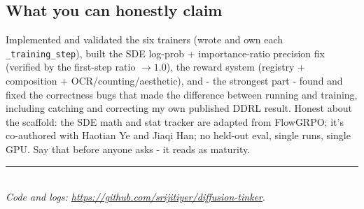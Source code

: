 \documentclass[11pt]{article}
\newcommand{\code}[1]{\texttt{\small #1}}
\begin{document}
\subsection{What you can honestly claim}
Implemented and validated the six trainers (wrote and own each \code{\_training\_step}),
built the SDE log-prob + importance-ratio precision fix (verified by the first-step
ratio $\to 1.0$), the reward system (registry + composition + OCR/counting/aesthetic),
and - the strongest part - found and fixed the correctness bugs that made the difference
between running and training, including catching and correcting my own published DDRL
result. Honest about the scaffold: the SDE math and stat tracker are adapted from
FlowGRPO; it's co-authored with Haotian Ye and Jiaqi Han; no held-out eval, single runs,
single GPU. Say that before anyone asks - it reads as maturity.

\vspace{1em}
\noindent\rule{\linewidth}{0.4pt}\\
\noindent\textit{Code and logs: \url{https://github.com/srijitiyer/diffusion-tinker}}.
\end{document}
